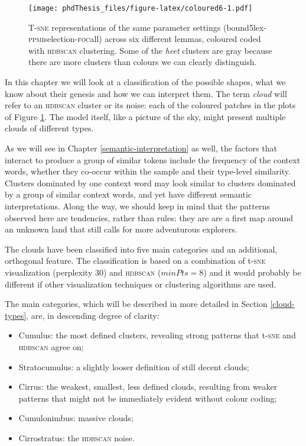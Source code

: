 \documentclass[
]{book}
\providecommand{\tightlist}{%
  \setlength{\itemsep}{0pt}\setlength{\parskip}{0pt}}
\begin{document}
\begin{figure}
\centering
\texttt{[image: phdThesis\_files/figure-latex/coloured6-1.pdf]}
\caption{\label{fig:coloured6}T-\textsc{sne} representations of the same parameter settings (bound5lex-\textsc{ppmi}selection-\textsc{foc}all) across six different lemmas, coloured coded with \textsc{hdbscan} clustering. Some of the \emph{heet} clusters are gray because there are more clusters than colours we can clearly distinguish.}
\end{figure}

In this chapter we will look at a classification of the possible shapes, what we know about their genesis and how we can interpret them. The term \emph{cloud} will refer to an \textsc{hdbscan} cluster or its noise: each of the coloured patches in the plots of Figure \ref{fig:coloured6}. The model itself, like a picture of the sky, might present multiple clouds of different types.

As we will see in Chapter \ref{semantic-interpretation} as well, the factors that interact to produce a group of similar tokens include the frequency of the context words, whether they co-occur within the sample and their type-level similarity. Clusters dominated by one context word may look similar to clusters dominated by a group of similar context words, and yet have different semantic interpretations. Along the way, we should keep in mind that the patterns observed here are tendencies, rather than rules: they are are a first map around an unknown land that still calls for more adventurous explorers.

The clouds have been classified into five main categories and an additional, orthogonal feature. The classification is based on a combination of t-\textsc{sne} visualization (perplexity 30) and \textsc{hdbscan} (\(minPts = 8\)) and it would probably be different if other visualization techniques or clustering algorithms are used.

The main categories, which will be described in more detailed in Section \ref{cloud-types}, are, in descending degree of clarity:

\begin{itemize}
\tightlist
\item
  Cumulus: the most defined clusters, revealing strong patterns that t-\textsc{sne} and \textsc{hdbscan} agree on;
\item
  Stratocumulus: a slightly looser definition of still decent clouds;
\item
  Cirrus: the weakest, smallest, less defined clouds, resulting from weaker patterns that might not be immediately evident without colour coding;
\item
  Cumulonimbus: massive clouds;
\item
  Cirrostratus: the \textsc{hdbscan} noise.
\end{itemize}
\end{document}
